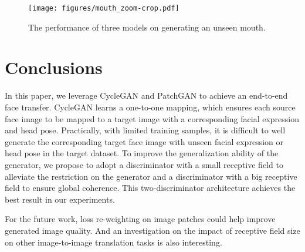 \documentclass[letterpaper]{article} %
\newcommand{\zhiming}[1]{{\bf \color{blue} [Zhiming says: #1]}}
\begin{document}
	
	
	
	\begin{figure}[t]
		\centering
		\vspace{3.5pt}
		\texttt{[image: figures/mouth\_zoom-crop.pdf]}\\
		\caption{The performance of three models on generating an unseen mouth. } \label{fig:mouth}
		\vspace{0pt}
	\end{figure}
	
	\section{Conclusions}
	In this paper, we leverage CycleGAN and PatchGAN to achieve an end-to-end face transfer. CycleGAN learns a one-to-one mapping, which ensures each source face image to be mapped to a target image with a corresponding facial expression and head pose.
	Practically, with limited training samples, it is difficult to well generate the corresponding target face image with unseen facial expression or head pose in the target dataset. To improve the generalization ability of the generator, we propose to adopt a discriminator with a small receptive field to alleviate the restriction on the generator and a discriminator with a big receptive field to ensure global coherence. This two-discriminator architecture achieves the best result in our experiments.
	
	For the future work, loss re-weighting on image patches could help improve generated image quality. And an investigation on the impact of receptive field size on other image-to-image translation tasks is also interesting.%
	
	
	
	
	
	
\end{document}
